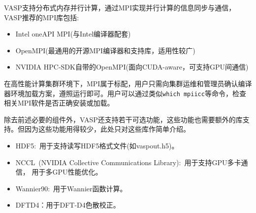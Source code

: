 \textrm{VASP}支持分布式内存并行计算，通过\textrm{MPI}实现并行计算的信息同步与通信，\textrm{VASP}推荐的\textrm{MPI}库包括:
\begin{itemize}
	\item \textrm{Intel oneAPI MPI}(与\textrm{Intel}编译器配套)
	\item \textrm{OpenMPI}(最通用的开源\textrm{MPI}编译器和支持库，适用性较广)
	\item \textrm{NVIDIA HPC-SDK}自带的\textrm{OpenMPI}(面向\textrm{CUDA-aware}，可支持\textrm{GPU}间通信)
\end{itemize}
在高性能计算集群环境下，\textrm{MPI}属于标配，用户只需向集群运维和管理员确认编译器环境加载方案，遵照运行即可。用户可以通过类似\texttt{which mpiicc}等命令，检查相关\textrm{MPI}软件是否正确安装或加载。

除去前述必要的组件外，\textrm{VASP}还支持若干可选功能，这些功能也需要额外的库支持。但因为这些功能用得较少，此处只对这些库作简单介绍。
\begin{itemize}
	\item \textrm{HDF5}:~用于支持读写\textrm{HDF5}格式文件(如\textrm{vaspout.h5})。%
	\item \textrm{NCCL~(NVIDIA Collective Communications Library)}:~用于支持\textrm{GPU}多卡通信，%
		用于多\textrm{GPU}性能优化。
	\item \textrm{Wannier90}:~用于\textrm{Wannier}函数计算。
	\item \textrm{DFTD4}：用于\textrm{DFT-D4}色散校正。
\end{itemize}

